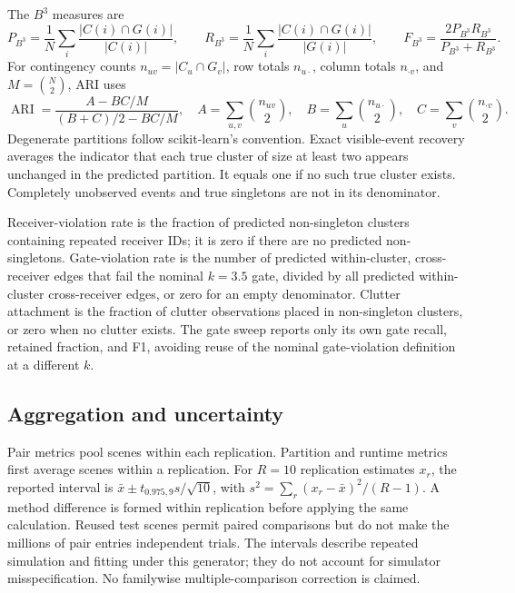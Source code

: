 \documentclass[10pt,a4paper]{article}
\begin{document}
The $B^3$ measures are
\begin{equation}
 P_{B^3}=\frac1N\sum_i\frac{|C(i)\cap G(i)|}{|C(i)|},\qquad
 R_{B^3}=\frac1N\sum_i\frac{|C(i)\cap G(i)|}{|G(i)|},\qquad
 F_{B^3}=\frac{2P_{B^3}R_{B^3}}{P_{B^3}+R_{B^3}}.
\end{equation}
For contingency counts $n_{uv}=|C_u\cap G_v|$, row totals $n_{u\cdot}$, column totals $n_{\cdot v}$, and $M=\binom N2$, ARI uses
\begin{equation}
 \operatorname{ARI}=\frac{A-BC/M}{(B+C)/2-BC/M},\quad
 A=\sum_{u,v}\binom{n_{uv}}2,\quad B=\sum_u\binom{n_{u\cdot}}2,\quad C=\sum_v\binom{n_{\cdot v}}2.
\end{equation}
Degenerate partitions follow scikit-learn's convention. Exact visible-event recovery averages the indicator that each true cluster of size at least two appears unchanged in the predicted partition. It equals one if no such true cluster exists. Completely unobserved events and true singletons are not in its denominator.

Receiver-violation rate is the fraction of predicted non-singleton clusters containing repeated receiver IDs; it is zero if there are no predicted non-singletons. Gate-violation rate is the number of predicted within-cluster, cross-receiver edges that fail the nominal $k=3.5$ gate, divided by all predicted within-cluster cross-receiver edges, or zero for an empty denominator. Clutter attachment is the fraction of clutter observations placed in non-singleton clusters, or zero when no clutter exists. The gate sweep reports only its own gate recall, retained fraction, and F1, avoiding reuse of the nominal gate-violation definition at a different $k$.

\subsection{Aggregation and uncertainty}
Pair metrics pool scenes within each replication. Partition and runtime metrics first average scenes within a replication. For $R=10$ replication estimates $x_r$, the reported interval is $\bar x\pm t_{0.975,9}s/\sqrt{10}$, with $s^2=\sum_r(x_r-\bar x)^2/(R-1)$. A method difference is formed within replication before applying the same calculation. Reused test scenes permit paired comparisons but do not make the millions of pair entries independent trials. The intervals describe repeated simulation and fitting under this generator; they do not account for simulator misspecification. No familywise multiple-comparison correction is claimed.
\end{document}
